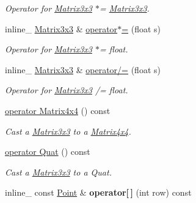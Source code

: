\begin{DoxyCompactItemize}
\begin{DoxyCompactList}\small\item\em Operator for \hyperlink{classOpcode_1_1Matrix3x3}{Matrix3x3} $\ast$= \hyperlink{classOpcode_1_1Matrix3x3}{Matrix3x3}. \end{DoxyCompactList}\item 
inline\+\_\+ \hyperlink{classOpcode_1_1Matrix3x3}{Matrix3x3} \& \hyperlink{classOpcode_1_1Matrix3x3_ac7354489b2987fa050796c047bc393e6}{operator$\ast$=} (float s)\hypertarget{classOpcode_1_1Matrix3x3_ac7354489b2987fa050796c047bc393e6}{}\label{classOpcode_1_1Matrix3x3_ac7354489b2987fa050796c047bc393e6}

\begin{DoxyCompactList}\small\item\em Operator for \hyperlink{classOpcode_1_1Matrix3x3}{Matrix3x3} $\ast$= float. \end{DoxyCompactList}\item 
inline\+\_\+ \hyperlink{classOpcode_1_1Matrix3x3}{Matrix3x3} \& \hyperlink{classOpcode_1_1Matrix3x3_a8db97ef4447c7448a22a95b2f5681937}{operator/=} (float s)\hypertarget{classOpcode_1_1Matrix3x3_a8db97ef4447c7448a22a95b2f5681937}{}\label{classOpcode_1_1Matrix3x3_a8db97ef4447c7448a22a95b2f5681937}

\begin{DoxyCompactList}\small\item\em Operator for \hyperlink{classOpcode_1_1Matrix3x3}{Matrix3x3} /= float. \end{DoxyCompactList}\item 
\hyperlink{classOpcode_1_1Matrix3x3_a6c18a333c52912661fe2017a882b9b4f}{operator Matrix4x4} () const \hypertarget{classOpcode_1_1Matrix3x3_a6c18a333c52912661fe2017a882b9b4f}{}\label{classOpcode_1_1Matrix3x3_a6c18a333c52912661fe2017a882b9b4f}

\begin{DoxyCompactList}\small\item\em Cast a \hyperlink{classOpcode_1_1Matrix3x3}{Matrix3x3} to a \hyperlink{classOpcode_1_1Matrix4x4}{Matrix4x4}. \end{DoxyCompactList}\item 
\hyperlink{classOpcode_1_1Matrix3x3_ab744c78f1e50b231bc63dc8940ea90be}{operator Quat} () const \hypertarget{classOpcode_1_1Matrix3x3_ab744c78f1e50b231bc63dc8940ea90be}{}\label{classOpcode_1_1Matrix3x3_ab744c78f1e50b231bc63dc8940ea90be}

\begin{DoxyCompactList}\small\item\em Cast a \hyperlink{classOpcode_1_1Matrix3x3}{Matrix3x3} to a Quat. \end{DoxyCompactList}\item 
inline\+\_\+ const \hyperlink{classOpcode_1_1Point}{Point} \& {\bfseries operator\mbox{[}$\,$\mbox{]}} (int row) const \hypertarget{classOpcode_1_1Matrix3x3_adbaea9a2fde1481ecf3e741109cd32c7}{}\label{classOpcode_1_1Matrix3x3_adbaea9a2fde1481ecf3e741109cd32c7}


\end{DoxyCompactItemize}
